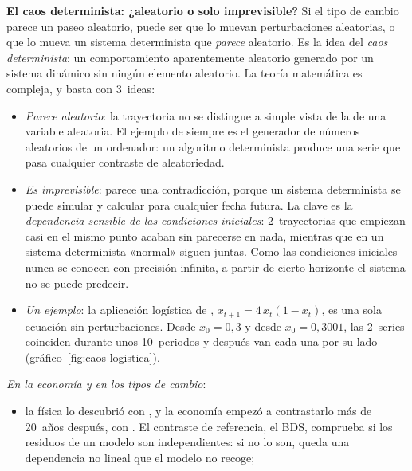 \documentclass[11pt]{article}
\begin{document}
\begin{anotaciones}[unbreakable]
\textbf{El caos determinista: ¿aleatorio o solo imprevisible?} Si el tipo de cambio parece un paseo aleatorio, puede ser que lo muevan perturbaciones aleatorias, o que lo mueva un sistema determinista que \emph{parece} aleatorio. Es la idea del \emph{caos determinista}: un comportamiento aparentemente aleatorio generado por un sistema dinámico sin ningún elemento aleatorio. La teoría matemática es compleja, y basta con 3~ideas:
\begin{itemize}
\item \emph{Parece aleatorio}: la trayectoria no se distingue a simple vista de la de una variable aleatoria. El ejemplo de siempre es el generador de números aleatorios de un ordenador: un algoritmo determinista produce una serie que pasa cualquier contraste de aleatoriedad.
\item \emph{Es imprevisible}: parece una contradicción, porque un sistema determinista se puede simular y calcular para cualquier fecha futura. La clave es la \emph{dependencia sensible de las condiciones iniciales}: 2~trayectorias que empiezan casi en el mismo punto acaban sin parecerse en nada, mientras que en un sistema determinista «normal» siguen juntas. Como las condiciones iniciales nunca se conocen con precisión infinita, a partir de cierto horizonte el sistema no se puede predecir.
\item \emph{Un ejemplo}: la aplicación logística de \textcite{May1976Simple}, $x_{t+1}=4\,x_t(1-x_t)$, es una sola ecuación sin perturbaciones. Desde $x_0=0{,}3$ y desde $x_0=0{,}3001$, las 2~series coinciden durante unos 10~periodos y después van cada una por su lado (gráfico~\ref{fig:caos-logistica}).
\end{itemize}
\begin{figuracaja}
\caption{La aplicación logística $x_{t+1}=4\,x_t(1-x_t)$ desde 2~condiciones iniciales casi iguales}\label{fig:caos-logistica}
\end{figuracaja}
\emph{En la economía y en los tipos de cambio}:
\begin{itemize}
\item la física lo descubrió con \textcite{Lorenz1963Deterministic}, y la economía empezó a contrastarlo más de 20~años después, con \textcite{Brock1986Distinguishing}. El contraste de referencia, el BDS\nocite{BrockDechertScheinkmanLeBaron1996}, comprueba si los residuos de un modelo son independientes: si no lo son, queda una dependencia no lineal que el modelo no recoge;

\end{itemize}
\end{anotaciones}
\end{document}
